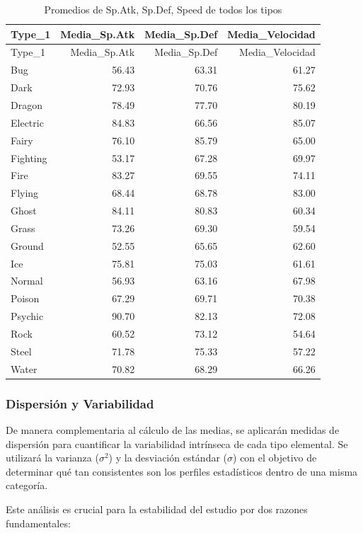 \documentclass[oneside,11pt]{Latex/Classes/PhDthesisPSnPDF}
\begin{document}
\begin{longtable}[]{@{}lrrr@{}}
\caption{Promedios de Sp.Atk, Sp.Def, Speed de todos los
tipos}\tabularnewline
\toprule\noalign{}
Type\_1 & Media\_Sp.Atk & Media\_Sp.Def & Media\_Velocidad \\
\midrule\noalign{}
\endfirsthead
\toprule\noalign{}
Type\_1 & Media\_Sp.Atk & Media\_Sp.Def & Media\_Velocidad \\
\midrule\noalign{}
\endhead
\bottomrule\noalign{}
\endlastfoot
Bug & 56.43 & 63.31 & 61.27 \\
Dark & 72.93 & 70.76 & 75.62 \\
Dragon & 78.49 & 77.70 & 80.19 \\
Electric & 84.83 & 66.56 & 85.07 \\
Fairy & 76.10 & 85.79 & 65.00 \\
Fighting & 53.17 & 67.28 & 69.97 \\
Fire & 83.27 & 69.55 & 74.11 \\
Flying & 68.44 & 68.78 & 83.00 \\
Ghost & 84.11 & 80.83 & 60.34 \\
Grass & 73.26 & 69.30 & 59.54 \\
Ground & 52.55 & 65.65 & 62.60 \\
Ice & 75.81 & 75.03 & 61.61 \\
Normal & 56.93 & 63.16 & 67.98 \\
Poison & 67.29 & 69.71 & 70.38 \\
Psychic & 90.70 & 82.13 & 72.08 \\
Rock & 60.52 & 73.12 & 54.64 \\
Steel & 71.78 & 75.33 & 57.22 \\
Water & 70.82 & 68.29 & 66.26 \\
\end{longtable}

\subsubsection{Dispersión y Variabilidad}

De manera complementaria al cálculo de las medias, se aplicarán medidas
de dispersión para cuantificar la variabilidad intrínseca de cada tipo
elemental. Se utilizará la varianza (\(\sigma^2\)) y la desviación
estándar (\(\sigma\)) con el objetivo de determinar qué tan consistentes
son los perfiles estadísticos dentro de una misma categoría.

Este análisis es crucial para la estabilidad del estudio por dos razones
fundamentales:
\end{document}
